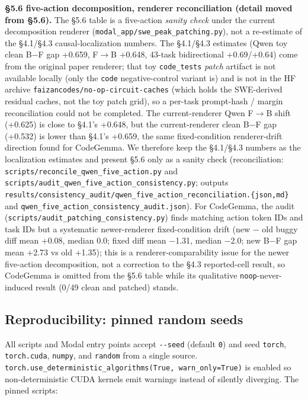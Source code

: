 \documentclass[
  11pt,
  a4paper]{article}
\begin{document}
\textbf{\S{}5.6 five-action decomposition, renderer reconciliation (detail
moved from \S{}5.6).} The \S{}5.6 table is a five-action \emph{sanity check}
under the current decomposition renderer
(\texttt{modal\_app/swe\_peak\_patching.py}), not a re-estimate of the
\S{}4.1/\S{}4.3 causal-localization numbers. The \S{}4.1/\S{}4.3 estimates (Qwen toy
clean B\ensuremath{-}F gap +0.659, F\ensuremath{\rightarrow}B +0.648, 43-task bidirectional +0.69/+0.64)
come from the original paper renderer; that toy \texttt{code\_tests}
\emph{patch} artifact is not available locally (only the \texttt{code}
negative-control variant is) and is not in the HF archive
\texttt{faizancodes/no-op-circuit-caches} (which holds the SWE-derived
residual caches, not the toy patch grid), so a per-task prompt-hash /
margin reconciliation could not be completed. The current-renderer Qwen
F\ensuremath{\rightarrow}B shift (+0.625) is close to \S{}4.1's +0.648, but the current-renderer
clean B\ensuremath{-}F gap (+0.532) is lower than \S{}4.1's +0.659, the same
fixed-condition renderer-drift direction found for CodeGemma. We
therefore keep the \S{}4.1/\S{}4.3 numbers as the localization estimates and
present \S{}5.6 only as a sanity check (reconciliation:
\texttt{scripts/}\allowbreak\texttt{reconcile\_qwen\_five\_action.py}
and
\texttt{scripts/}\allowbreak\texttt{audit\_qwen\_five\_action\_consistency.py};
outputs
\texttt{results/}\allowbreak\texttt{consistency\_audit/}\allowbreak\texttt{qwen\_five\_action\_reconciliation.\{json,md\}}
and \texttt{qwen\_five\_action\_consistency\_audit.json}). For
CodeGemma, the audit
(\texttt{scripts/}\allowbreak\texttt{audit\_patching\_consistency.py})
finds matching action token IDs and task IDs but a systematic
newer-renderer fixed-condition drift (new \ensuremath{-} old buggy diff mean +0.08,
median 0.0; fixed diff mean \ensuremath{-}1.31, median \ensuremath{-}2.0; new B\ensuremath{-}F gap mean +2.73
vs old +1.35); this is a renderer-comparability issue for the newer
five-action decomposition, not a correction to the \S{}4.3 reported-cell
result, so CodeGemma is omitted from the \S{}5.6 table while its
qualitative \texttt{noop}-never-induced result (0/49 clean and patched)
stands.

\subsection{Reproducibility: pinned random
seeds}\label{reproducibility-pinned-random-seeds}

All scripts and Modal entry points accept \texttt{-\/-seed} (default
\texttt{0}) and seed \texttt{torch}, \texttt{torch.cuda},
\texttt{numpy}, and \texttt{random} from a single source.
\texttt{torch.use\_deterministic\_algorithms(True,\ warn\_only=True)} is
enabled so non-deterministic CUDA kernels emit warnings instead of
silently diverging. The pinned scripts:
\end{document}
